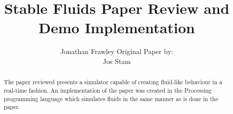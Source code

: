 \documentclass{acmtog}
\begin{document}


\title{Stable Fluids Paper Review and Demo Implementation} %

\author{Jonathan Frawley
Original Paper by:\\
Jos Stam
}





\maketitle

\begin{abstract} 
The paper reviewed presents a simulator capable of creating fluid-like behaviour in a real-time fashion.
An implementation of the paper was created in the Processing programming language which simulates fluids in the same manner as is done in the paper.
\end{abstract}









\end{document}
